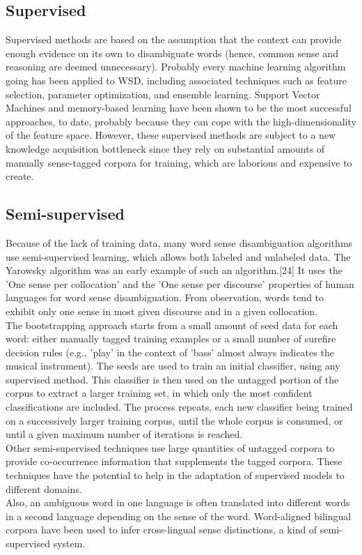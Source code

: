 \subsection*{Supervised}
Supervised methods are based on the assumption that the context can provide enough evidence on its own to disambiguate words (hence, common sense and reasoning are deemed unnecessary). Probably every machine learning algorithm going has been applied to WSD, including associated techniques such as feature selection, parameter optimization, and ensemble learning. Support Vector Machines and memory-based learning have been shown to be the most successful approaches, to date, probably because they can cope with the high-dimensionality of the feature space. However, these supervised methods are subject to a new knowledge acquisition bottleneck since they rely on substantial amounts of manually sense-tagged corpora for training, which are laborious and expensive to create.
\subsection*{Semi-supervised}
Because of the lack of training data, many word sense disambiguation algorithms use semi-supervised learning, which allows both labeled and unlabeled data. The Yarowsky algorithm was an early example of such an algorithm.[24] It uses the 'One sense per collocation' and the 'One sense per discourse' properties of human languages for word sense disambiguation. From observation, words tend to exhibit only one sense in most given discourse and in a given collocation.\\
The bootstrapping approach starts from a small amount of seed data for each word: either manually tagged training examples or a small number of surefire decision rules (e.g., 'play' in the context of 'bass' almost always indicates the musical instrument). The seeds are used to train an initial classifier, using any supervised method. This classifier is then used on the untagged portion of the corpus to extract a larger training set, in which only the most confident classifications are included. The process repeats, each new classifier being trained on a successively larger training corpus, until the whole corpus is consumed, or until a given maximum number of iterations is reached.\\
Other semi-supervised techniques use large quantities of untagged corpora to provide co-occurrence information that supplements the tagged corpora. These techniques have the potential to help in the adaptation of supervised models to different domains.\\
Also, an ambiguous word in one language is often translated into different words in a second language depending on the sense of the word. Word-aligned bilingual corpora have been used to infer cross-lingual sense distinctions, a kind of semi-supervised system.
